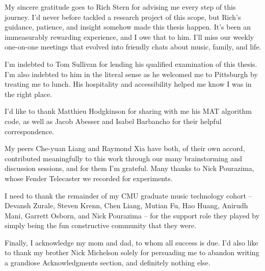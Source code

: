 \documentclass[12pt]{cmuthesis}
\begin{document}
\begin{acknowledgments}
My sincere gratitude goes to Rich Stern for advising me every step of this journey. I'd never before tackled a research project of this scope, but Rich's guidance, patience, and insight somehow made this thesis happen. It's been an immeasurably rewarding experience, and I owe that to him. I'll miss our weekly one-on-one meetings that evolved into friendly chats about music, family, and life.

I'm indebted to Tom Sullivan for lending his qualified examination of this thesis. I'm also indebted to him in the literal sense as he welcomed me to Pittsburgh by treating me to lunch. His hospitality and accessibility helped me know I was in the right place.

I'd like to thank Matthieu Hodgkinson for sharing with me his MAT algorithm code, as well as Jacob Abesser and Isabel Barbancho for their helpful correspondence. 

My peers Che-yuan Liang and Raymond Xia have both, of their own accord, contributed meaningfully to this work through our many brainstorming and discussion sessions, and for them I'm grateful. Many thanks to Nick Pourazima, whose Fender Telecaster we recorded for experiments.

I need to thank the remainder of my CMU graduate music technology cohort -- Devansh Zurale, Steven Krenn, Chen Liang, Mutian Fu, Hao Huang, Anirudh Mani, Garrett Osborn, and Nick Pourazima -- for the support role they played by simply being the fun constructive community that they were.

Finally, I acknowledge my mom and dad, to whom all success is due. I'd also like to thank my brother Nick Michelson solely for persuading me to abandon writing a grandiose Acknowledgments section, and definitely nothing else.

\end{acknowledgments}



\tableofcontents
\listoffigures
\listoftables

\mainmatter


%
%
%
%
%
\doublespacing
\noindent
\end{document}
